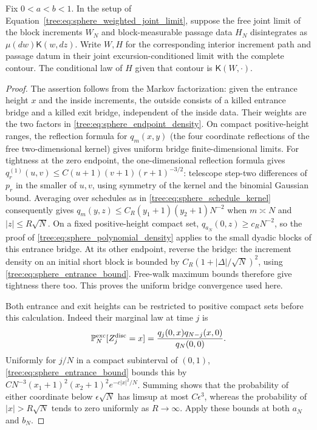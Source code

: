 \begin{lemma}
\label{tree:lem:sphere_exterior_kernel}
Fix $0<a<b<1$. In the setup of
Equation~\eqref{tree:eq:sphere_weighted_joint_limit}, suppose the free
joint limit of the block increments $W_N$ and block-measurable passage
data $H_N$ disintegrates as $\mu(dw)\mathsf K(w,dz)$.
Write $W,H$ for the corresponding interior increment path and passage
datum in their joint excursion-conditioned limit with the complete
contour. The conditional law of $H$ given that contour is
$\mathsf K(W,\cdot)$.
\end{lemma}
\begin{proof}
The assertion follows from the Markov factorization: given
the entrance height $x$ and the inside increments, the outside consists
of a killed entrance bridge and a killed exit bridge, independent of
the inside data.  Their weights are the two factors in
\eqref{tree:eq:sphere_endpoint_density}.  On compact positive-height ranges,
the reflection formula for $q_m(x,y)$ (the four coordinate reflections
of the free two-dimensional kernel) gives uniform bridge
finite-dimensional limits.  For tightness at the zero endpoint, the
one-dimensional reflection formula gives
$q_r^{(1)}(u,v)\leq C(u+1)(v+1)(r+1)^{-3/2}$: telescope step-two
differences of $p_r$ in the smaller of $u,v$, using symmetry of the
kernel and the binomial Gaussian bound.  Averaging over schedules as in
\eqref{tree:eq:sphere_schedule_kernel} consequently gives
$q_m(y,z)\leq C_R(y_1+1)(y_2+1)N^{-2}$ when $m\asymp N$ and
$|z|\leq R\sqrt N$.  On a fixed positive-height compact set,
$q_{a_N}(0,z)\geq c_RN^{-2}$, so the proof of
\eqref{tree:eq:sphere_polynomial_density} applies to the small dyadic blocks
of this entrance bridge.  At its other endpoint, reverse the bridge:
the increment density on an initial short block is bounded by
$C_R(1+|\Delta|/\sqrt N)^2$, using
\eqref{tree:eq:sphere_entrance_bound}.  Free-walk maximum bounds therefore
give tightness there too.  This proves the uniform bridge convergence
used here.

Both entrance and exit heights can be restricted to positive compact
sets before this calculation.  Indeed their marginal law at time $j$ is
\[
 \mathbb P_N^{\mathrm{exc}}[Z_j^{\mathrm{disc}}=x]
       =\frac{q_j(0,x)q_{N-j}(x,0)}{q_N(0,0)}.
\]
Uniformly for $j/N$ in a compact subinterval of $(0,1)$,
\eqref{tree:eq:sphere_entrance_bound} bounds this by
$CN^{-3}(x_1+1)^2\allowbreak\mbox{$(x_2+1)^2$}e^{-c|x|^2/N}$.
Summing shows that the probability of either coordinate below
$\epsilon\sqrt N$ has limsup at most $C\epsilon^3$, whereas the
probability of $|x|>R\sqrt N$ tends to zero uniformly as $R\to\infty$.
Apply these bounds at both $a_N$ and $b_N$.


\end{proof}
